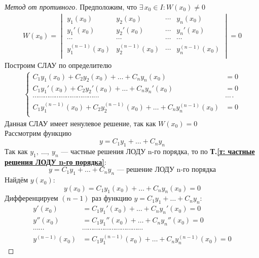 \begin{proof}[Метод от противного]
    Предположим, что $\exists\, x_0 \in I\colon W(x_0) \ne 0$
    \begin{gather*}
        W (x_0) = \begin{vmatrix}
            y_1(x_0) & y_2(x_0) & \cdots & y_n(x_0) \\
            y_1'(x_0) & y_2'(x_0) & \cdots & y_n'(x_0) \\
            \cdots & \cdots & \cdots & \cdots \\
            y_1^{(n-1)}(x_0) & y_2^{(n-1)}(x_0) & \cdots & y_n^{(n-1)}(x_0)\\
        \end{vmatrix} = 0
    \end{gather*}
    Построим СЛАУ по определителю
    \begin{gather*}
        \left\{ \begin{aligned}
            C_1 y_1(x_0) + C_2 y_2(x_0) + \ldots + C_n y_n(x_0) &= 0\\
            C_1 y_1'(x_0) + C_2 y_2'(x_0) + \ldots + C_n y_n'(x_0) &= 0\\
            \cdots\cdots\cdots\cdots\cdots\cdots\cdots\cdots\cdots\cdots\cdots\cdots&\cdots\cdot \\
            C_1 y_1^{(n-1)}(x_0) + C_2 y_2^{(n-1)}(x_0) + \ldots + C_n y_n^{(n-1)}(x_0) &= 0 \\
        \end{aligned} \right.
    \end{gather*}
    Данная СЛАУ имеет ненулевое решение, так как $W(x_0) = 0$\\
    Рассмотрим функцию 
    \[
    y = C_1y_1 + \ldots + C_ny_n
    \]
    Так как $y_1,\ \ldots,\ y_n$ --- частные решения ЛОДУ n-го порядка, то по \textbf{Т.\ref{т: частные решения ЛОДУ n-го порядка}}:
    \[
        y = C_1y_1 + \ldots + C_ny_n \text{ --- решение ЛОДУ n-го порядка}
    \]
    Найдём $y(x_0)$:
    \[
        y(x_0) = C_1y_1(x_0) + \ldots + C_ny_n(x_0) = 0
    \]
    Дифференцируем $(n-1)$ раз функцию $y = C_1y_1 + \ldots + C_ny_n$:
    \begin{align*}
        y'(x_0) &= C_1y_1'(x_0) + \ldots + C_ny_n'(x_0) = 0 \\
        y''(x_0) &= C_1y_1''(x_0) + \ldots + C_ny_n''(x_0) = 0 \\
        \cdots\cdots&\cdots\cdots\cdots\cdots\cdots\cdots\cdots\cdots\cdots\cdots\cdots \\
        y^{(n-1)}(x_0) &= C_1y_1^{(n-1)}(x_0) + \ldots + C_ny_n^{(n-1)}(x_0) = 0

\end{align*}
\end{proof}
